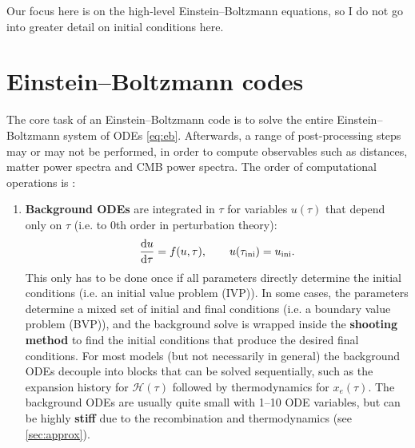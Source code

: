 \documentclass[USenglish, thumbmarks]{uiophdthesis} %
\newcommand\ini{\mathrm{ini}}
\newcommand\EB{Einstein--Boltzmann}
\newcommand\calH{\mathcal{H}}
\begin{document}
Our focus here is on the high-level \EB{} equations,
so I do not go into greater detail on initial conditions here.

\section{\EB{} codes}
\label{sec:eb_codes}

The core task of an \EB{} code is to solve the entire \EB{} system of ODEs \eqref{eq:eb}.
Afterwards, a range of post-processing steps may or may not be performed,
in order to compute observables such as distances, matter power spectra and CMB power spectra.
The order of computational operations is
\cite[e.g.][]{callinHowCalculateCMB2006b,lesgourguesCosmicLinearAnisotropy2011d,wintherscoming}:
\begin{enumerate}
\item \textbf{Background ODEs} are integrated in $\tau$ for variables $u(\tau)$ that depend only on $\tau$
(i.e. to 0th order in perturbation theory):
\begin{equation}
\odv{u}{\tau} = f(u, \tau),
\qquad
u(\tau_\ini) = u_\ini.
\label{eq:bg_ode}
\end{equation}
This only has to be done once if all parameters directly determine the initial conditions (i.e. an initial value problem (IVP)).
In some cases, the parameters determine a mixed set of initial and final conditions (i.e. a boundary value problem (BVP)),
and the background solve is wrapped inside the \textbf{shooting method} to find the initial conditions that produce the desired final conditions.
For most models (but not necessarily in general) the background ODEs decouple into blocks that can be solved sequentially,
such as the expansion history for $\calH(\tau)$ followed by thermodynamics for $x_e(\tau)$.
The background ODEs are usually quite small with 1--10 ODE variables,
but can be highly \textbf{stiff} due to the recombination and thermodynamics (see \cref{sec:approx}).
\label{eb:bg}


\end{enumerate}
\end{document}
